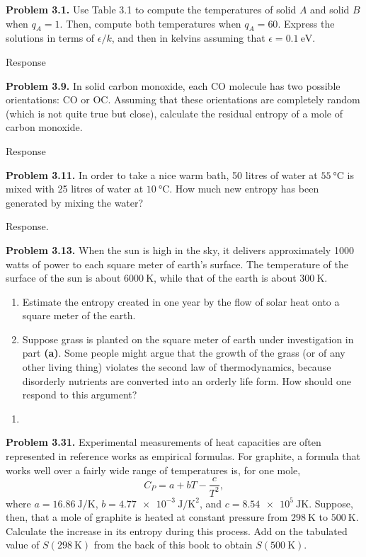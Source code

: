 \documentclass[a4paper, 12pt]{config/homework}
\begin{document}
\pagebreak
\noindent
\textbf{Problem 3.1.} Use Table 3.1 to compute the temperatures of solid \(A\) and solid \(B\) when \(q_A=1\). Then, compute both temperatures when \(q_A=60\). Express the solutions in terms of \(\epsilon/k\), and then in kelvins assuming that \(\epsilon=\qty{0.1}{\eV}\).

\noindent
Response


\bigskip
\noindent
\textbf{Problem 3.9.} In solid carbon monoxide, each CO molecule has two possible orientations: CO or OC. Assuming that these orientations are completely random (which is not quite true but close), calculate the residual entropy of a mole of carbon monoxide.

\noindent
Response


\bigskip
\noindent
\textbf{Problem 3.11.} In order to take a nice warm bath, 50 litres of water at \(\qty{55}{\celsius}\) is mixed with 25 litres of water at \(\qty{10}{\celsius}\). How much new entropy has been generated by mixing the water?

\noindent
Response.


\bigskip
\noindent
\textbf{Problem 3.13.} When the sun is high in the sky, it delivers approximately 1000 watts of power to each square meter of earth's surface. The temperature of the surface of the sun is about \(\qty{6000}{\kelvin}\), while that of the earth is about \(\qty{300}{\kelvin}\).
\begin{enumerate}[label=\textbf{(\alph*)}]
\item Estimate the entropy created in one year by the flow of solar heat onto a square meter of the earth.
\item Suppose grass is planted on the square meter of earth under investigation in part \textbf{(a)}. Some people might argue that the growth of the grass (or of any other living thing) violates the second law of thermodynamics, because disorderly nutrients are converted into an orderly life form. How should one respond to this argument?
\end{enumerate}
\begin{enumerate}[label=\textbf{(\alph*)}]
\item 
\end{enumerate}


\bigskip
\noindent
\textbf{Problem 3.31.} Experimental measurements of heat capacities are often represented in reference works as empirical formulas. For graphite, a formula that works well over a fairly wide range of temperatures is, for one mole,
\[C_P = a + bT - \frac{c}{T^2},\]
where \(a=\qty{16.86}{\joule\per\kelvin}\), \(b=\qty{4.77e-3}{\joule\per\kelvin\squared}\), and \(c=\qty{8.54e5}{\joule\kelvin}\). Suppose, then, that a mole of graphite is heated at constant pressure from \(\qty{298}{\kelvin}\) to \(\qty{500}{\kelvin}\). Calculate the increase in its entropy during this process. Add on the tabulated value of \(S(\qty{298}{\kelvin})\) from the back of this book to obtain \(S(\qty{500}{\kelvin})\).
\end{document}
